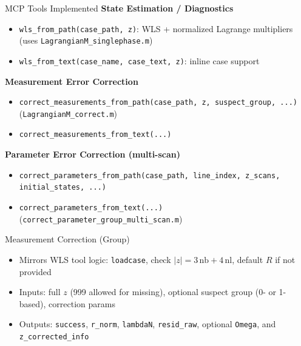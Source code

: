 \documentclass{beamer}
\begin{document}
\begin{frame}{MCP Tools Implemented}
  \textbf{State Estimation / Diagnostics}
  \begin{itemize}
    \item \texttt{wls\_from\_path(case\_path, z)}: WLS + normalized Lagrange multipliers (uses \texttt{LagrangianM\_singlephase.m})
    \item \texttt{wls\_from\_text(case\_name, case\_text, z)}: inline case support
  \end{itemize}
  \vspace{0.5em}
  \textbf{Measurement Error Correction}
  \begin{itemize}
    \item \texttt{correct\_measurements\_from\_path(case\_path, z, suspect\_group, ...)} (\texttt{LagrangianM\_correct.m})
    \item \texttt{correct\_measurements\_from\_text(...)}
  \end{itemize}
  \vspace{0.5em}
  \textbf{Parameter Error Correction (multi-scan)}
  \begin{itemize}
    \item \texttt{correct\_parameters\_from\_path(case\_path, line\_index, z\_scans, initial\_states, ...)}
    \item \texttt{correct\_parameters\_from\_text(...)} (\texttt{correct\_parameter\_group\_multi\_scan.m})
  \end{itemize}
\end{frame}

\begin{frame}{Measurement Correction (Group)}
  \begin{itemize}
    \item Mirrors WLS tool logic: \texttt{loadcase}, check $|z|=3\,\text{nb}+4\,\text{nl}$, default $R$ if not provided
    \item Inputs: full $z$ (999 allowed for missing), optional suspect group (0- or 1-based), correction params
    \item Outputs: \texttt{success}, \texttt{r\_norm}, \texttt{lambdaN}, \texttt{resid\_raw}, optional \texttt{Omega}, and \texttt{z\_corrected\_info}
  \end{itemize}
\end{frame}
\end{document}
